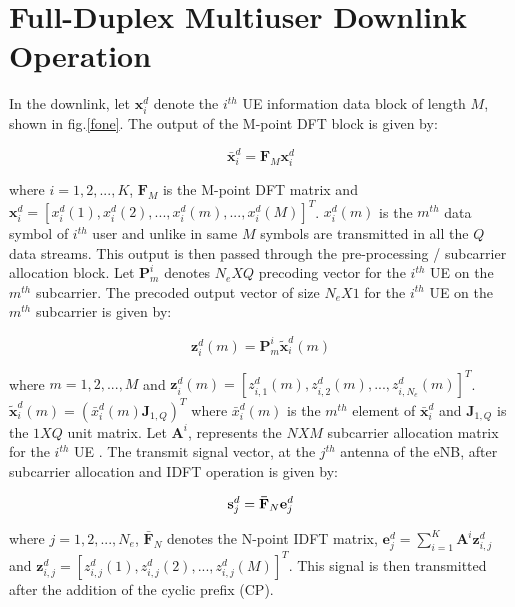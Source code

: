 \documentclass[conference]{IEEEtran}
\begin{document}
  
\section{Full-Duplex Multiuser Downlink Operation}
    In the downlink, let $\mathbf{x}^d_i$  denote the $i^{th}$ UE information data block of length $M$, shown in fig.\ref{fone}. The output of the M-point DFT block is given by:

\begin{equation}
\label{two}
\mathbf{\bar{x}}_i^d = \mathbf{F}_M \mathbf{x}_i^d
       \end{equation} 
    
                                                                 
where $i=1,2,...,K$, $\mathbf{F}_M$  is the M-point DFT matrix and $\mathbf{x}_i^d = [x_i^d(1),x_i^d(2),...,x_i^d(m),...,x_i^d(M)]^T $. $x_i^d(m)$ is the $m^{th}$ data symbol of $i^{th}$ user and unlike in \cite{sc_fdma} same $M$ symbols are transmitted in all the $Q$ data streams. This output is then passed through the pre-processing / subcarrier allocation block. Let  $\mathbf{P}^i_m$ denotes $N_e X Q$  precoding vector for the $i^{th}$ UE on the $m^{th}$ subcarrier. The precoded output vector of size $N_e X 1$ for the $i^{th}$ UE on the $m^{th}$ subcarrier is given by:

\begin{equation}
\label{three}
\mathbf{z}^d_i(m) = \mathbf{P}^i_m \mathbf{\tilde{x}}_i^d (m)
       \end{equation}   
       
where $m=1,2,...,M$ and $\mathbf{z}^d_i(m) = [z^d_{i,1}(m), z^d_{i,2}(m),...,z^d_{i,N_e}(m)]^T$. $\mathbf{\tilde{x}}_i^d (m)= (\bar{x}_i^d(m) \mathbf{J}_{1,Q})^T$ where $\bar{x}_i^d(m)$ is the $m^{th}$ element of $\mathbf{\bar{x}}_i^d$ and $\mathbf{J}_{1,Q}$ is the $1 X Q$ unit matrix. Let $\mathbf{A}^i$, represents the $N X M$ subcarrier allocation matrix for the $i^{th}$ UE \cite{sc_fdma}. The transmit signal vector, at the $j^{th}$ antenna of the eNB, after subcarrier allocation and IDFT operation is given by:  

\begin{equation}
\label{four}
\mathbf{s}^d_j = \mathbf{\bar{F}}_N \mathbf{e}^d_j
\vspace{-0.10em}
       \end{equation} 
       
where $j=1,2,...,N_e$, $\mathbf{\bar{F}}_N$ denotes the N-point IDFT matrix, $\mathbf{e}^d_j = \sum_{i=1}^{K} \mathbf{A}^i \mathbf{z}^d_{i,j}$ and $\mathbf{z}^d_{i,j}=[z^d_{i,j}(1), z^d_{i,j}(2),...,z^d_{i,j}(M)]^T$. This signal is then transmitted after the addition of the cyclic prefix (CP). \par
\end{document}
